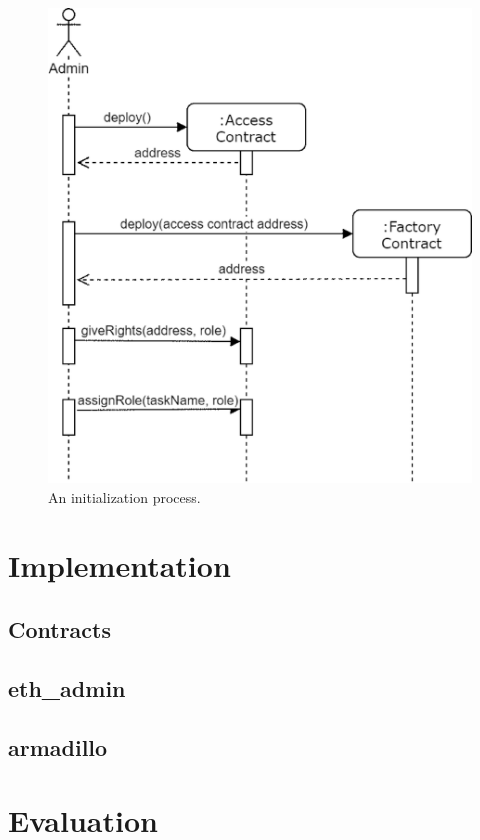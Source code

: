 \documentclass[runningheads]{llncs}
\begin{document}
\begin{figure}
\includegraphics[width=\textwidth]{fig/initialization.eps}
\caption{An initialization process.} \label{fig2}
\end{figure}

\section{Implementation}

\subsection{Contracts}

\subsection{eth\_admin}

\subsection{armadillo}

\section{Evaluation}
\end{document}
